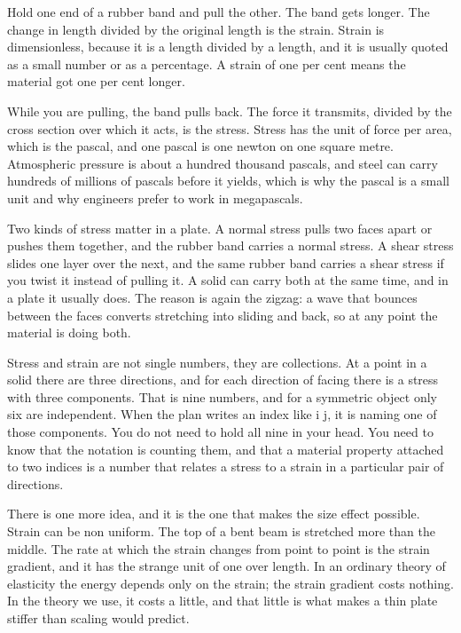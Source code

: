 \documentclass[11pt]{article}
\begin{document}
Hold one end of a rubber band and pull the other. The band gets longer. The change in length divided by the
original length is the strain. Strain is dimensionless, because it is a length divided by a length, and it
is usually quoted as a small number or as a percentage. A strain of one per cent means the material got one
per cent longer.

While you are pulling, the band pulls back. The force it transmits, divided by the cross section over which
it acts, is the stress. Stress has the unit of force per area, which is the pascal, and one pascal is one
newton on one square metre. Atmospheric pressure is about a hundred thousand pascals, and steel can carry
hundreds of millions of pascals before it yields, which is why the pascal is a small unit and why engineers
prefer to work in megapascals.

Two kinds of stress matter in a plate. A normal stress pulls two faces apart or pushes them together, and the
rubber band carries a normal stress. A shear stress slides one layer over the next, and the same rubber band
carries a shear stress if you twist it instead of pulling it. A solid can carry both at the same time, and in
a plate it usually does. The reason is again the zigzag: a wave that bounces between the faces converts
stretching into sliding and back, so at any point the material is doing both.

Stress and strain are not single numbers, they are collections. At a point in a solid there are three
directions, and for each direction of facing there is a stress with three components. That is nine numbers,
and for a symmetric object only six are independent. When the plan writes an index like i j, it is naming one
of those components. You do not need to hold all nine in your head. You need to know that the notation is
counting them, and that a material property attached to two indices is a number that relates a stress to a
strain in a particular pair of directions.

There is one more idea, and it is the one that makes the size effect possible. Strain can be non uniform. The
top of a bent beam is stretched more than the middle. The rate at which the strain changes from point to point
is the strain gradient, and it has the strange unit of one over length. In an ordinary theory of elasticity
the energy depends only on the strain; the strain gradient costs nothing. In the theory we use, it costs a
little, and that little is what makes a thin plate stiffer than scaling would predict.
\end{document}
